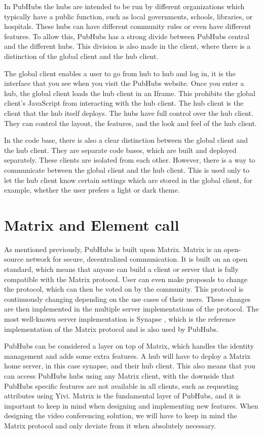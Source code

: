 \documentclass{report}
\begin{document}
In PubHubs the hubs are intended to be run by different organizations which typically have a public function, such as
local governments, schools, libraries, or hospitals.
These hubs can have different community rules or even have different features.
To allow this, PubHubs has a strong divide between PubHubs central and the different hubs.
This division is also made in the client, where there is a distinction of the global client and the hub client.

The global client enables a user to go from hub to hub and log in, it is
the interface that you see when you visit the PubHubs website. Once you enter a hub, the global client loads the hub
client in an Iframe. This prohibits the global client's JavaScript from interacting with the hub client.
The hub client is the client that the hub itself deploys. The hubs have full control over the
hub client. They can control the layout, the features, and the look and feel of the hub client.

In the code base, there is also a clear distinction between the global client and the hub client. They
are separate code bases, which are built and deployed separately. These clients are isolated from each other.
However, there is a way to communicate between the global client and the hub client. This is used only to let the
hub client know certain settings which are stored in the global client, for example, whether the user prefers a
light or dark theme.

\section{Matrix and Element call}\label{sec:matrix}
As mentioned previously, PubHubs is built upon Matrix. Matrix is an open-source network for secure, decentralized
communication. It is built on an open standard, which means that anyone can build a client or server that is fully
compatible with the Matrix protocol. User can even make proposals to change the protocol, which can then be voted on
by the community. This protocol is continuously changing depending on the use cases of their users. These changes
are then implemented in the multiple server implementations of the protocol. The most well-known server
implementation is Synapse \cite{noauthor_element-hqsynapse_nodate}, which is the reference implementation of the
Matrix protocol and is also used by PubHubs.

PubHubs can be considered a layer on top of Matrix, which handles the identity management and adds some extra features.
A hub will have to deploy a Matrix home server, in this case synapse, and their hub client. This also means that you can
access PubHubs hubs using any Matrix client, with the downside that PubHubs specific features are not available in
all clients, such as requesting attributes using Yivi. Matrix is the fundamental layer of PubHubs, and it is
important to keep in mind when designing and implementing new features. When designing the video conferencing
solution, we will have to keep in mind the Matrix protocol and only deviate from it when absolutely necessary.
\end{document}
